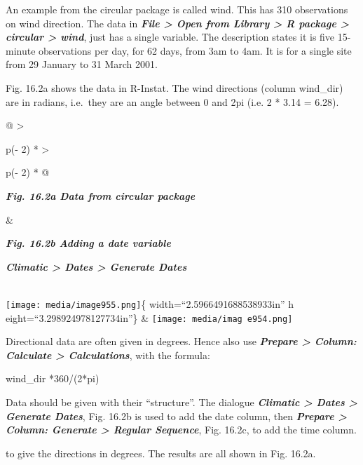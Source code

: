 \documentclass[
  letterpaper,
  DIV=11,
  numbers=noendperiod]{scrreprt}
\begin{document}
An example from the circular package is called wind. This has 310
observations on wind direction. The data in \textbf{\emph{File
\textgreater{} Open from Library \textgreater{} R package \textgreater{}
circular \textgreater{} wind}}, just has a single variable. The
description states it is five 15-minute observations per day, for 62
days, from 3am to 4am. It is for a single site from 29 January to 31
March 2001.

Fig. 16.2a shows the data in R-Instat. The wind directions (column
wind\_dir) are in radians, i.e.~they are an angle between 0 and 2pi
(i.e. 2 * 3.14 = 6.28).

\begin{longtable}[]{@{}
  >{\raggedright\arraybackslash}p{(\columnwidth - 2\tabcolsep) * }
  >{\raggedright\arraybackslash}p{(\columnwidth - 2\tabcolsep) * }@{}}
\toprule\noalign{}
\begin{minipage}[b]{\linewidth}\raggedright
\textbf{\emph{Fig. 16.2a Data from circular package}}
\end{minipage} & \begin{minipage}[b]{\linewidth}\raggedright
\textbf{\emph{Fig. 16.2b Adding a date variable}}

\textbf{\emph{Climatic \textgreater{} Dates \textgreater{} Generate
Dates}}
\end{minipage} \\
\midrule\noalign{}
\endhead
\bottomrule\noalign{}
\endlastfoot
\texttt{[image: media/image955.png]}\{ width=``2.5966491688538933in'' h
eight=``3.298924978127734in''\} &
\texttt{[image: media/imag e954.png]} \\
\end{longtable}

Directional data are often given in degrees. Hence also use
\textbf{\emph{Prepare \textgreater{} Column: Calculate \textgreater{}
Calculations}}, with the formula:

wind\_dir *360/(2*pi)

Data should be given with their ``structure''. The dialogue
\textbf{\emph{Climatic \textgreater{} Dates \textgreater{} Generate
Dates}}, Fig. 16.2b is used to add the date column, then
\textbf{\emph{Prepare \textgreater{} Column: Generate \textgreater{}
Regular Sequence}}, Fig. 16.2c, to add the time column.

to give the directions in degrees. The results are all shown in Fig.
16.2a.
\end{document}
